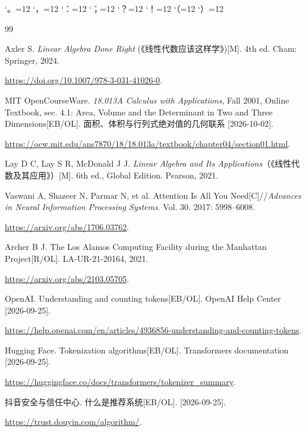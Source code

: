 \documentclass[a4paper,12pt,twoside,openany,fontset=none]{ctexbook}
\numberwithin{equation}{chapter}
\begin{document}
\begingroup
\catcode`。=12 \catcode`，=12 \catcode`：=12 \catcode`；=12
\catcode`？=12 \catcode`！=12 \catcode`（=12 \catcode`）=12
\renewcommand{\bibname}{参考文献}
\linespread{1}\fontsize{11pt}{17pt}\selectfont
{}
\begin{thebibliography}{99}
\setlength{\itemsep}{10pt}
\setlength{\parsep}{0pt}
\renewcommand{\newblock}{\par\nobreak}
\raggedright

Axler S. \textit{Linear Algebra Done Right} (《线性代数应该这样学》)[M]. 4th ed. Cham: Springer, 2024.
\newblock \url{https://doi.org/10.1007/978-3-031-41026-0}.

MIT OpenCourseWare. \textit{18.013A Calculus with Applications}, Fall 2001, Online Textbook, sec. 4.1: Area, Volume and the Determinant in Two and Three Dimensions[EB/OL]. 面积、体积与行列式绝对值的几何联系 [2026-10-02].
\newblock \url{https://ocw.mit.edu/ans7870/18/18.013a/textbook/chapter04/section01.html}.

Lay D C, Lay S R, McDonald J J. \textit{Linear Algebra and Its Applications}（《线性代数及其应用》）[M]. 6th ed., Global Edition. Pearson, 2021.

Vaswani A, Shazeer N, Parmar N, et al. Attention Is All You Need[C]//\textit{Advances in Neural Information Processing Systems}. Vol. 30. 2017: 5998--6008.
\newblock \url{https://arxiv.org/abs/1706.03762}.

Archer B J. The Los Alamos Computing Facility during the Manhattan Project[R/OL]. LA-UR-21-20164, 2021.
\newblock \url{https://arxiv.org/abs/2103.05705}.

OpenAI. Understanding and counting tokens[EB/OL]. OpenAI Help Center \mbox{[2026-09-25]}.
\newblock \url{https://help.openai.com/en/articles/4936856-understanding-and-counting-tokens}.

Hugging Face. Tokenization algorithms[EB/OL]. Transformers documentation \mbox{[2026-09-25]}.
\newblock \url{https://huggingface.co/docs/transformers/tokenizer_summary}.

抖音安全与信任中心. 什么是推荐系统[EB/OL]. \mbox{[2026-09-25]}.
\newblock \url{https://trust.douyin.com/algorithm/}.


\end{thebibliography}
\end{document}
